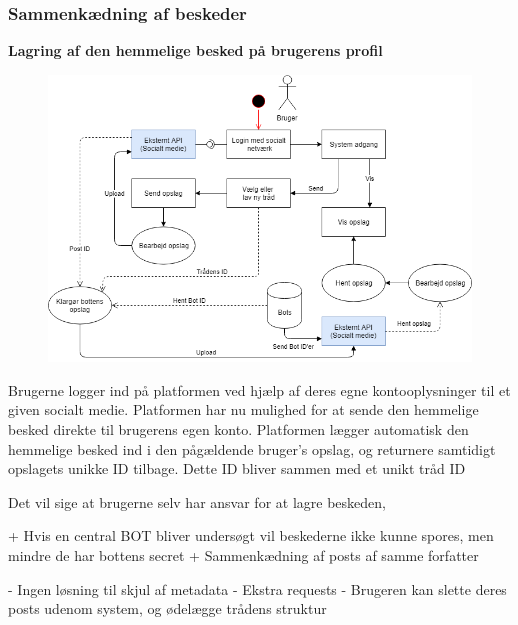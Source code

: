 \subsubsection{Sammenkædning af beskeder}

\textbf{Lagring af den hemmelige besked på brugerens profil}
\begin{figure}[H]
    \centering
    \includegraphics[width=0.8\linewidth]{Projectdoc/Assets/Illustrationer/userbased-system.png}
    \caption{}
    \label{fig:userbased}
\end{figure}
Brugerne logger ind på platformen ved hjælp af deres egne kontooplysninger til et given socialt medie. Platformen har nu mulighed for at sende den hemmelige besked direkte til brugerens egen konto. Platformen lægger automatisk den hemmelige besked ind i den pågældende bruger's opslag, og returnere samtidigt opslagets unikke ID tilbage. Dette ID bliver sammen med et unikt tråd ID 

Det vil sige at brugerne selv har ansvar for at lagre beskeden,


+ Hvis en central BOT bliver undersøgt vil beskederne ikke kunne spores, men mindre de har bottens secret
+ Sammenkædning af posts af samme forfatter

- Ingen løsning til skjul af metadata
- Ekstra requests
- Brugeren kan slette deres posts udenom system, og ødelægge trådens struktur




